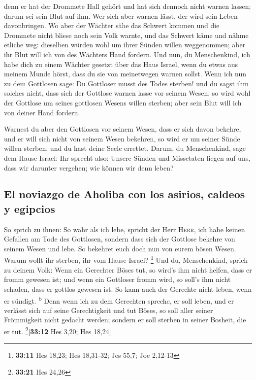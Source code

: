  denn er hat der Drommete Hall gehört und hat sich dennoch
nicht warnen lassen; darum sei sein Blut auf ihm. Wer sich aber warnen
lässt, der wird sein Leben davonbringen.  Wo aber der
Wächter sähe das Schwert kommen und die Drommete nicht bliese noch sein
Volk warnte, und das Schwert käme und nähme etliche weg: dieselben
würden wohl um ihrer Sünden willen weggenommen; aber ihr Blut will ich
von des Wächters Hand fordern.  Und nun, du Menschenkind,
ich habe dich zu einem Wächter gesetzt über das Haus Israel, wenn du
etwas aus meinem Munde hörst, dass du sie von meinetwegen warnen sollst.
 Wenn ich nun zu dem Gottlosen sage: Du Gottloser musst
des Todes sterben! und du sagst ihm solches nicht, dass sich der
Gottlose warnen lasse vor seinem Wesen, so wird wohl der Gottlose um
seines gottlosen Wesens willen sterben; aber sein Blut will ich von
deiner Hand fordern.

 Warnest du aber den Gottlosen vor seinem Wesen, dass er
sich davon bekehre, und er will sich nicht von seinem Wesen bekehren, so
wird er um seiner Sünde willen sterben, und du hast deine Seele
errettet.  Darum, du Menschenkind, sage dem Hause Israel:
Ihr sprecht also: Unsere Sünden und Missetaten liegen auf uns, dass wir
darunter vergehen; wie können wir denn leben?

\hypertarget{el-noviazgo-de-aholiba-con-los-asirios-caldeos-y-egipcios}{%
\subsection{El noviazgo de Aholiba con los asirios, caldeos y
egipcios}\label{el-noviazgo-de-aholiba-con-los-asirios-caldeos-y-egipcios}}

 So sprich zu ihnen: So wahr als ich lebe, spricht der
Herr \textsc{Herr}, ich habe keinen Gefallen am Tode des Gottlosen,
sondern dass sich der Gottlose bekehre von seinem Wesen und lebe. So
bekehret euch doch nun von eurem bösen Wesen. Warum wollt ihr sterben,
ihr vom Hause Israel? \footnote{\textbf{33:11} Hes 18,23; Hes 18,31-32;
  Jes 55,7; Joe 2,12-13}  Und du, Menschenkind, sprich zu
deinem Volk: Wenn ein Gerechter Böses tut, so wird's ihm nicht helfen,
dass er fromm gewesen ist; und wenn ein Gottloser fromm wird, so soll's
ihm nicht schaden, dass er gottlos gewesen ist. So kann auch der
Gerechte nicht leben, wenn er sündigt. \textsuperscript{b}
 Denn wenn ich zu dem Gerechten spreche, er soll leben,
und er verlässt sich auf seine Gerechtigkeit und tut Böses, so soll
aller seiner Frömmigkeit nicht gedacht werden; sondern er soll sterben
in seiner Bosheit, die er tut. \footnote{\textbf{33:21} Hes 24,26}{[}\textbf{33:12}
Hes 3,20; Hes 18,24{]}


